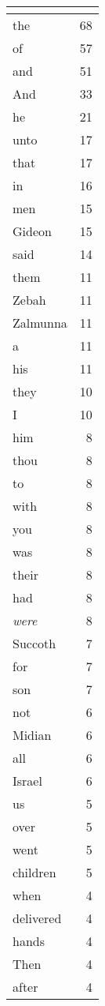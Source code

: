 \begin{center}
\begin{longtable}{l|r}
\hline \multicolumn{2}{c}{{ }} \\ \hline
\endfoot 
the & 68\\ \hline 
of & 57\\ \hline 
and & 51\\ \hline 
And & 33\\ \hline 
he & 21\\ \hline 
unto & 17\\ \hline 
that & 17\\ \hline 
in & 16\\ \hline 
men & 15\\ \hline 
Gideon & 15\\ \hline 
said & 14\\ \hline 
them & 11\\ \hline 
Zebah & 11\\ \hline 
Zalmunna & 11\\ \hline 
a & 11\\ \hline 
his & 11\\ \hline 
they & 10\\ \hline 
I & 10\\ \hline 
him & 8\\ \hline 
thou & 8\\ \hline 
to & 8\\ \hline 
with & 8\\ \hline 
you & 8\\ \hline 
was & 8\\ \hline 
their & 8\\ \hline 
had & 8\\ \hline 
\emph{were} & 8\\ \hline 
Succoth & 7\\ \hline 
for & 7\\ \hline 
son & 7\\ \hline 
not & 6\\ \hline 
Midian & 6\\ \hline 
all & 6\\ \hline 
Israel & 6\\ \hline 
us & 5\\ \hline 
over & 5\\ \hline 
went & 5\\ \hline 
children & 5\\ \hline 
when & 4\\ \hline 
delivered & 4\\ \hline 
hands & 4\\ \hline 
Then & 4\\ \hline 
after & 4\\ \hline 

\end{longtable}
\end{center}
